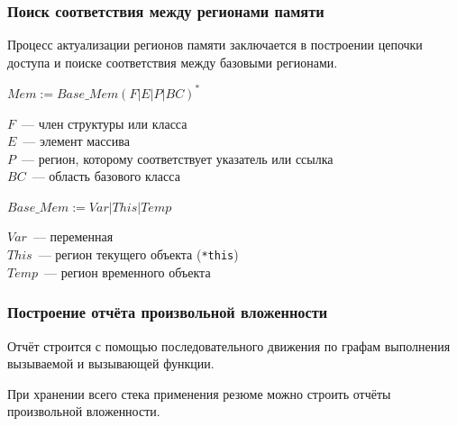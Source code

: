 \documentclass[10pt,gray]{beamer}
\begin{document}

\begin{frame}
\frametitle{Поиск соответствия между регионами памяти}
Процесс актуализации регионов памяти заключается в построении цепочки доступа и поиске соответствия между базовыми регионами.
\vspace{10pt}

$Mem := Base\_Mem(F|E|P|BC)^*$

\vspace{10pt}

$F$~--- член структуры или класса\\
$E$~--- элемент массива\\
$P$~--- регион, которому соответствует указатель или ссылка\\
$BC$~--- область базового класса

\vspace{10pt}

$Base\_Mem := Var|This|Temp$

\vspace{10pt}

$Var$~--- переменная\\
$This$~--- регион текущего объекта (\texttt{*this})\\
$Temp$~--- регион временного объекта


\end{frame}


\begin{frame}
\frametitle{Построение отчёта произвольной вложенности}
Отчёт строится с помощью последовательного движения по графам выполнения вызываемой и вызывающей функции.

При хранении всего стека применения резюме можно строить отчёты произвольной вложенности.
\begin{figure}[h]
\end{figure}
\end{frame}
\end{document}
